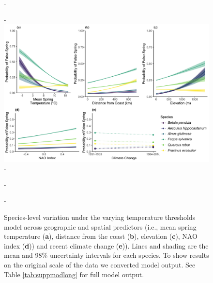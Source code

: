 \documentclass{article}\usepackage[]{graphicx}\usepackage[]{color}
\begin{document}
{\begin{figure} [H]
  -\begin{center}
  -\includegraphics[width=12cm]{..//..//analyses/figures/InteractionPlots/Species_longtemps.png}
  -\caption{Species-level variation under the varying temperature thresholds model across geographic and spatial predictors (i.e., mean spring temperature (\textbf{a}), distance from the coast (\textbf{b}), elevation (\textbf{c}), NAO index (\textbf{d})) and recent climate change (\textbf{e})). Lines and shading are the mean and 98\% uncertainty intervals for each species. To show results on the original scale of the data we converted model output. See Table \ref{tab:suppmodlong} for full model output. }\label{fig:spptemps}
  -\end{center}
  -\end{figure}}
\end{document}
